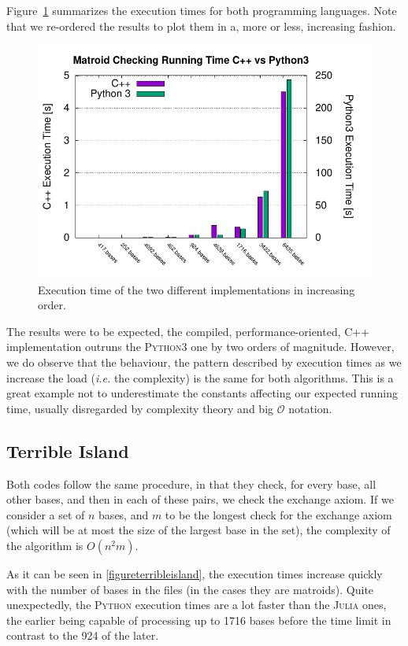 \documentclass[11pt]{amsart}
\begin{document}
Figure~\ref{fig:team-bearland-times} summarizes the execution times for both programming languages.
Note that we re-ordered the results to plot them in a, more or less, increasing fashion. 
\begin{figure}[h!]
    \centering
    \includegraphics[width=.7\textwidth]{./team-berland/exec_time.pdf}
    \caption{Execution time of the two different implementations in increasing order.\label{fig:team-bearland-times}}
\end{figure}
The results were to be expected, the compiled, performance-oriented, \textsc{C++} implementation outruns the \textsc{Python3} one by two orders of magnitude.
However, we do observe that the behaviour, the pattern described by execution times as we increase the load (\textit{i.e.} the complexity) is the same for both algorithms.
This is a great example not to underestimate the constants affecting our expected running time, usually disregarded by complexity theory and big $\mathcal{O}$ notation.

\subsection{Terrible Island}
\label{terribleisland}

Both codes follow the same procedure, in that they check, for every base, all other bases, and then in each of these pairs, we check the exchange axiom. If we consider a set of $n$ bases, and $m$ to be the longest check for the exchange axiom (which will be at most the size of the largest base in the set), the complexity of the algorithm is $O(n^{2}m)$.

As it can be seen in \ref{figureterribleisland}, the execution times increase quickly with the number of bases in the files (in the cases they are matroids). Quite unexpectedly, the \textsc{Python} execution times are a lot faster than the \textsc{Julia} ones, the earlier being capable of processing up to 1716 bases before the time limit in contrast to the 924 of the later.
\end{document}
